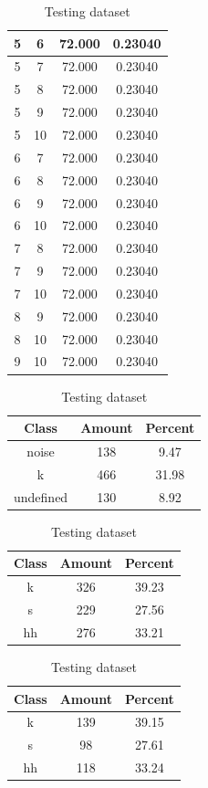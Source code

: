 \begin{table}
\begin{subtable}[h]{0.45\textwidth}
{\begin{tabular}{|c|c|c|c|}
 5 & 6 & 72.000 & 0.23040\\ \hline 
 5 & 7 & 72.000 & 0.23040\\ \hline 
 5 & 8 & 72.000 & 0.23040\\ \hline 
 5 & 9 & 72.000 & 0.23040\\ \hline 
 5 & 10 & 72.000 & 0.23040\\ \hline 
 6 & 7 & 72.000 & 0.23040\\ \hline 
 6 & 8 & 72.000 & 0.23040\\ \hline 
 6 & 9 & 72.000 & 0.23040\\ \hline 
 6 & 10 & 72.000 & 0.23040\\ \hline 
 7 & 8 & 72.000 & 0.23040\\ \hline 
 7 & 9 & 72.000 & 0.23040\\ \hline 
 7 & 10 & 72.000 & 0.23040\\ \hline 
 8 & 9 & 72.000 & 0.23040\\ \hline 
 8 & 10 & 72.000 & 0.23040\\ \hline 
 9 & 10 & 72.000 & 0.23040\\ \hline 

\end{tabular}
}\label{xlscentroid105}
\caption{xcscentroid105}
\end{subtable}

\begin{subtable}[h]{0.45\textwidth}
\centering
\begin{tabular}{|c|c|c|}
\hline
Class & Amount & Percent\\ \hline
noise & 138 & 9.47\\ \hline
k & 466 & 31.98\\ \hline
undefined & 130 & 8.92\\ \hline
\end{tabular}
\caption{Entire dataset after stripping short sounds}
\end{subtable}
\hfill
\begin{subtable}[h]{0.45\textwidth}
\centering
\begin{tabular}{|c|c|c|}
\hline
Class & Amount & Percent\\ \hline
k & 326 & 39.23\\ \hline
s & 229 & 27.56\\ \hline
hh & 276 & 33.21\\ \hline
\end{tabular}
\caption{Training dataset}
\end{subtable}
\hfill
\begin{subtable}[h]{0.45\textwidth}
\centering
\begin{tabular}{|c|c|c|}
\hline
Class & Amount & Percent\\ \hline
k & 139 & 39.15\\ \hline
s & 98 & 27.61\\ \hline
hh & 118 & 33.24\\ \hline
\end{tabular}
\caption{Testing dataset}
\end{subtable}
\hfill


\end{table}
